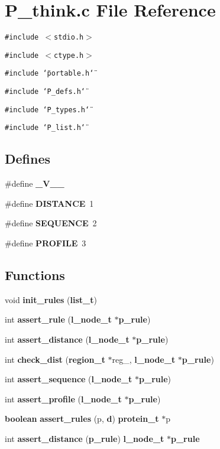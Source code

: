 \section{P\_\-think.c File Reference}
\label{P__think_8c}
{\tt \#include $<$stdio.h$>$}\par
{\tt \#include $<$ctype.h$>$}\par
{\tt \#include \char`\"{}portable.h\char`\"{}}\par
{\tt \#include \char`\"{}P\_\-defs.h\char`\"{}}\par
{\tt \#include \char`\"{}P\_\-types.h\char`\"{}}\par
{\tt \#include \char`\"{}P\_\-list.h\char`\"{}}\par
\subsection*{Defines}
\begin{CompactItemize}
\item 
\#define {\bf \_\-V\_\_\-}
\item 
\#define {\bf DISTANCE}\ 1
\item 
\#define {\bf SEQUENCE}\ 2
\item 
\#define {\bf PROFILE}\ 3
\end{CompactItemize}
\subsection*{Functions}
\begin{CompactItemize}
\item 
void {\bf init\_\-rules} ({\bf list\_\-t})
\item 
int {\bf assert\_\-rule} ({\bf l\_\-node\_\-t} $\ast${\bf p\_\-rule})
\item 
int {\bf assert\_\-distance} ({\bf l\_\-node\_\-t} $\ast${\bf p\_\-rule})
\item 
int {\bf check\_\-dist} ({\bf region\_\-t} $\ast$reg\_, {\bf l\_\-node\_\-t} $\ast${\bf p\_\-rule})
\item 
int {\bf assert\_\-sequence} ({\bf l\_\-node\_\-t} $\ast${\bf p\_\-rule})
\item 
int {\bf assert\_\-profile} ({\bf l\_\-node\_\-t} $\ast${\bf p\_\-rule})
\item 
{\bf boolean} {\bf assert\_\-rules} (p, {\bf d}) {\bf protein\_\-t} $\ast$p
\item 
int {\bf assert\_\-distance} ({\bf p\_\-rule}) {\bf l\_\-node\_\-t} $\ast${\bf p\_\-rule}
\end{CompactItemize}
